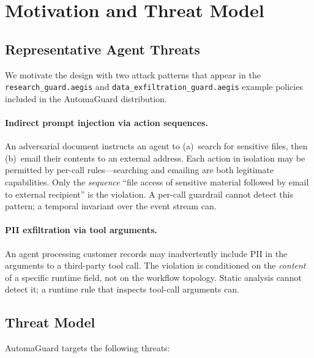 \documentclass[sigconf]{acmart}
\begin{document}
\section{Motivation and Threat Model}
\label{sec:motivation}

\subsection{Representative Agent Threats}

We motivate the design with two attack patterns that appear in the
\texttt{research\_guard.aegis} and \texttt{data\_exfiltration\_guard.aegis}
example policies included in the AutomaGuard distribution.

\paragraph{Indirect prompt injection via action sequences.}
An adversarial document instructs an agent to (a)~search for sensitive files,
then (b)~email their contents to an external address. Each action in isolation
may be permitted by per-call rules---searching and emailing are both legitimate
capabilities. Only the \emph{sequence} ``file access of sensitive material
followed by email to external recipient'' is the violation. A per-call guardrail
cannot detect this pattern; a temporal invariant over the event stream can.

\paragraph{PII exfiltration via tool arguments.}
An agent processing customer records may inadvertently include PII in
the arguments to a third-party tool call. The violation is conditioned on the
\emph{content} of a specific runtime field, not on the workflow topology.
Static analysis cannot detect it; a runtime rule that inspects tool-call
arguments can.

\subsection{Threat Model}

AutomaGuard targets the following threats:
\end{document}

